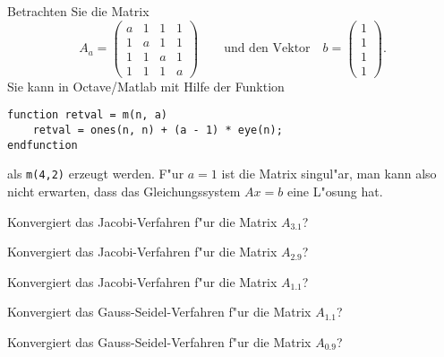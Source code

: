Betrachten Sie die Matrix
\[
A_a=\begin{pmatrix}
a&1&1&1\\
1&a&1&1\\
1&1&a&1\\
1&1&1&a
\end{pmatrix}
\qquad\text{und den Vektor}\quad
b=\begin{pmatrix}1\\1\\1\\1\end{pmatrix}.
\]
Sie kann in Octave/Matlab mit Hilfe der Funktion
\begin{verbatim}
function retval = m(n, a)
    retval = ones(n, n) + (a - 1) * eye(n);
endfunction
\end{verbatim}
als {\tt m(4,2)} erzeugt werden. 
F"ur $a=1$ ist die Matrix singul"ar, man kann also nicht erwarten, dass
das Gleichungssystem $Ax=b$ eine L"osung hat. 
\begin{teilaufgaben}
\item Konvergiert das Jacobi-Verfahren f"ur die Matrix $A_{3.1}$?
\item Konvergiert das Jacobi-Verfahren f"ur die Matrix $A_{2.9}$?
\item Konvergiert das Jacobi-Verfahren f"ur die Matrix $A_{1.1}$?
\item Konvergiert das Gauss-Seidel-Verfahren f"ur die Matrix $A_{1.1}$?
\item Konvergiert das Gauss-Seidel-Verfahren f"ur die Matrix $A_{0.9}$?
\end{teilaufgaben}

